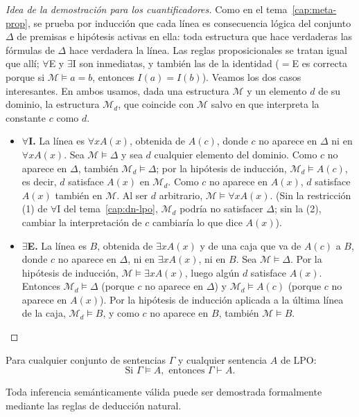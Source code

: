 \begin{proof}[Idea de la demostración para los cuantificadores\ampliacion]
Como en el tema~\ref{cap:meta-prop}, se prueba por inducción que cada línea es consecuencia lógica del conjunto $\Delta$ de premisas e hipótesis activas en ella: toda estructura que hace verdaderas las fórmulas de $\Delta$ hace verdadera la línea. Las reglas proposicionales se tratan igual que allí; $\forall$E y $\exists$I son inmediatas, y también las de la identidad ($=$E es correcta porque si $\mathcal{M} \models a = b$, entonces $I(a) = I(b)$). Veamos los dos casos interesantes. En ambos usamos, dada una estructura $\mathcal{M}$ y un elemento $d$ de su dominio, la estructura $\mathcal{M}_d$, que coincide con $\mathcal{M}$ salvo en que interpreta la constante $c$ como $d$.
\begin{itemize}
    \item \textbf{$\forall$I.} La línea es $\forall x A(x)$, obtenida de $A(c)$, donde $c$ no aparece en $\Delta$ ni en $\forall x A(x)$. Sea $\mathcal{M} \models \Delta$ y sea $d$ cualquier elemento del dominio. Como $c$ no aparece en $\Delta$, también $\mathcal{M}_d \models \Delta$; por la hipótesis de inducción, $\mathcal{M}_d \models A(c)$, es decir, $d$ satisface $A(x)$ en $\mathcal{M}_d$. Como $c$ no aparece en $A(x)$, $d$ satisface $A(x)$ también en $\mathcal{M}$. Al ser $d$ arbitrario, $\mathcal{M} \models \forall x A(x)$. (Sin la restricción (1) de $\forall$I del tema~\ref{cap:dn-lpo}, $\mathcal{M}_d$ podría no satisfacer $\Delta$; sin la (2), cambiar la interpretación de $c$ cambiaría lo que dice $A(x)$).
    \item \textbf{$\exists$E.} La línea es $B$, obtenida de $\exists x A(x)$ y de una caja que va de $A(c)$ a $B$, donde $c$ no aparece en $\Delta$, ni en $\exists x A(x)$, ni en $B$. Sea $\mathcal{M} \models \Delta$. Por la hipótesis de inducción, $\mathcal{M} \models \exists x A(x)$, luego algún $d$ satisface $A(x)$. Entonces $\mathcal{M}_d \models \Delta$ (porque $c$ no aparece en $\Delta$) y $\mathcal{M}_d \models A(c)$ (porque $c$ no aparece en $A(x)$). Por la hipótesis de inducción aplicada a la última línea de la caja, $\mathcal{M}_d \models B$, y como $c$ no aparece en $B$, también $\mathcal{M} \models B$. \qedhere
\end{itemize}
\end{proof}

\begin{theorem}
Para cualquier conjunto de sentencias $\Gamma$ y cualquier sentencia $A$ de LPO:
\[
\text{Si } \Gamma \models A, \text{ entonces } \Gamma \vdash A.
\]
\end{theorem}
Toda inferencia semánticamente válida puede ser demostrada formalmente mediante las reglas de deducción natural.

